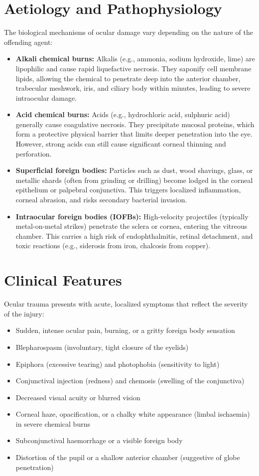 \section*{Aetiology and Pathophysiology}
The biological mechanisms of ocular damage vary depending on the nature of the offending agent:
\begin{itemize}
    \item \textbf{Alkali chemical burns:} Alkalis (e.g., ammonia, sodium hydroxide, lime) are lipophilic and cause rapid liquefactive necrosis. They saponify cell membrane lipids, allowing the chemical to penetrate deep into the anterior chamber, trabecular meshwork, iris, and ciliary body within minutes, leading to severe intraocular damage.
    \item \textbf{Acid chemical burns:} Acids (e.g., hydrochloric acid, sulphuric acid) generally cause coagulative necrosis. They precipitate mucosal proteins, which form a protective physical barrier that limits deeper penetration into the eye. However, strong acids can still cause significant corneal thinning and perforation.
    \item \textbf{Superficial foreign bodies:} Particles such as dust, wood shavings, glass, or metallic shards (often from grinding or drilling) become lodged in the corneal epithelium or palpebral conjunctiva. This triggers localized inflammation, corneal abrasion, and risks secondary bacterial invasion.
    \item \textbf{Intraocular foreign bodies (IOFBs):} High-velocity projectiles (typically metal-on-metal strikes) penetrate the sclera or cornea, entering the vitreous chamber. This carries a high risk of endophthalmitis, retinal detachment, and toxic reactions (e.g., siderosis from iron, chalcosis from copper).
\end{itemize}

\section*{Clinical Features}
Ocular trauma presents with acute, localized symptoms that reflect the severity of the injury:
\begin{itemize}
    \item Sudden, intense ocular pain, burning, or a gritty foreign body sensation
    \item Blepharospasm (involuntary, tight closure of the eyelids)
    \item Epiphora (excessive tearing) and photophobia (sensitivity to light)
    \item Conjunctival injection (redness) and chemosis (swelling of the conjunctiva)
    \item Decreased visual acuity or blurred vision
    \item Corneal haze, opacification, or a chalky white appearance (limbal ischaemia) in severe chemical burns
    \item Subconjunctival haemorrhage or a visible foreign body
    \item Distortion of the pupil or a shallow anterior chamber (suggestive of globe penetration)
\end{itemize}


